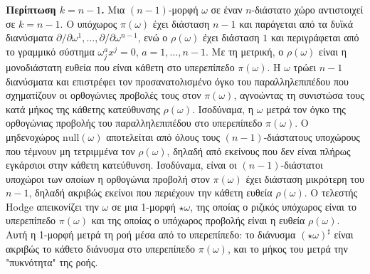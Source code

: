 \documentclass[12pt]{article}
\begin{document}
\textbf{Περίπτωση $k=n-1$.} Μια $(n-1)$-μορφή $\omega$ σε έναν $n$-διάστατο χώρο αντιστοιχεί σε $k=n-1$. Ο υπόχωρος $\pi(\omega)$ έχει διάσταση $n-1$ και παράγεται από τα δυϊκά διανύσματα $\partial / \partial \omega^1, \dots, \partial / \partial \omega^{n-1}$, ενώ ο $\rho(\omega)$ έχει διάσταση $1$ και περιγράφεται από το γραμμικό σύστημα $\omega^a_j x^j = 0$, $a = 1, \dots, n-1$. Με τη μετρική, ο $\rho(\omega)$ είναι η μονοδιάστατη ευθεία που είναι κάθετη στο υπερεπίπεδο $\pi(\omega)$. Η $\omega$ τρώει $n-1$ διανύσματα και επιστρέφει τον προσανατολισμένο όγκο του παραλληλεπιπέδου που σχηματίζουν οι ορθογώνιες προβολές τους στον $\pi(\omega)$, αγνοώντας τη συνιστώσα τους κατά μήκος της κάθετης κατεύθυνσης $\rho(\omega)$. Ισοδύναμα, η $\omega$ μετρά τον όγκο της ορθογώνιας προβολής του παραλληλεπιπέδου στο υπερεπίπεδο $\pi(\omega)$. Ο μηδενοχώρος $\text{null}(\omega)$ αποτελείται από όλους τους $(n-1)$-διάστατους υποχώρους που τέμνουν μη τετριμμένα τον $\rho(\omega)$, δηλαδή από εκείνους που δεν είναι πλήρως εγκάρσιοι στην κάθετη κατεύθυνση. Ισοδύναμα, είναι οι $(n-1)$-διάστατοι υποχώροι των οποίων η ορθογώνια προβολή στον $\pi(\omega)$ έχει διάσταση μικρότερη του $n-1$, δηλαδή ακριβώς εκείνοι που περιέχουν την κάθετη ευθεία $\rho(\omega)$. Ο τελεστής Hodge απεικονίζει την $\omega$ σε μια 1-μορφή $\star \omega$, της οποίας ο ριζικός υπόχωρος είναι το υπερεπίπεδο $\pi(\omega)$ και της οποίας ο υπόχωρος προβολής είναι η ευθεία $\rho(\omega)$. Αυτή η 1-μορφή μετρά τη ροή μέσα από το υπερεπίπεδο: το διάνυσμα $(\star \omega)^\sharp$ είναι ακριβώς το κάθετο διάνυσμα στο υπερεπίπεδο $\pi(\omega)$, και το μήκος του μετρά την "πυκνότητα" της ροής.
\end{document}
